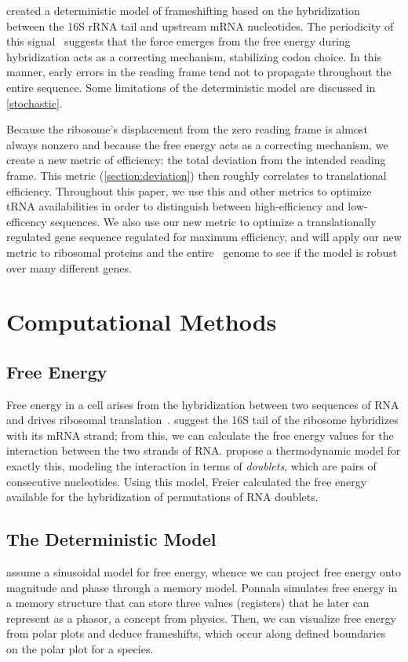 \documentclass[12pt]{article}
\numberwithin{equation}{section}
\begin{document}
\citet{lalit:embs} created a deterministic model of frameshifting
based on the hybridization between the 16S rRNA tail and upstream mRNA
nucleotides.  The periodicity of this signal~\cite{lalit:jbsb}
suggests that the force emerges from the free energy during
hybridization acts as a correcting mechanism, stabilizing codon
choice.  In this manner, early errors in the reading frame tend not to
propagate throughout the entire sequence.  Some limitations of the
deterministic model are discussed in \autoref{stochastic}.

Because the ribosome's displacement from the zero reading frame is
almost always nonzero and because the free energy acts as a correcting
mechanism, we create a new metric of efficiency: the total deviation
from the intended reading frame.  This metric
(\autoref{section:deviation}) then roughly correlates to translational
efficiency.  Throughout this paper, we use this and other metrics to
optimize tRNA availabilities in order to distinguish between
high-efficiency and low-efficency sequences. We also use our new
metric to optimize a translationally regulated gene sequence
regulated for maximum efficiency, and will apply our new metric to
ribosomal proteins and the entire \ecoli\ genome to see if the model
is robust over many different genes.

\section{Computational Methods}
\subsection{Free Energy}
\label{freeenergy}

Free energy in a cell arises from the hybridization between two
sequences of RNA and drives ribosomal translation~\cite{starmer}.
\citet{weiss88} suggest the 16S tail of the ribosome hybridizes with its mRNA strand;
from this, we can calculate the free energy values for the interaction between the two strands of RNA.
\citet{freier} propose a thermodynamic model for exactly this,
modeling the interaction in terms of \emph{doublets}, which are pairs of consecutive nucleotides.
Using this model, Freier calculated the free energy available
for the hybridization of permutations of RNA doublets.

\subsection{The Deterministic Model}
\citet{lalit:mechanics} assume a sinusoidal model for
free energy, whence we can project free energy onto magnitude and
phase through a memory model. Ponnala simulates free
energy in a memory structure that can store three values (registers)
that he later can represent as a phasor, a concept from physics. Then,
we can visualize free energy from polar plots and deduce frameshifts,
which occur along defined boundaries~\citet{lalit:mechanics} on the polar plot for a species.
 
\end{document}
